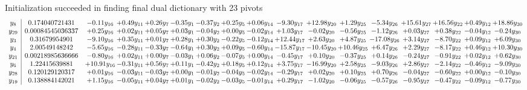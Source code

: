 \documentclass[9pt]{article}
\begin{document}
Initialization succeeded in finding final dual dictionary with 23 pivots
\[\begin{array}{c| c c@{\hskip 2pt} c@{\hskip 2pt} c@{\hskip 2pt} c@{\hskip 2pt} c@{\hskip 2pt} c@{\hskip 2pt} c@{\hskip 2pt} c@{\hskip 2pt} c@{\hskip 2pt} c@{\hskip 2pt} c@{\hskip 2pt} c@{\hskip 2pt} c@{\hskip 2pt} c@{\hskip 2pt} c@{\hskip 2pt} }
 y_{8}   &  0.174040721431 & -0.11 y_{16} & +  0.49 y_{11} & +  0.26 y_{7} & -0.35 y_{1} & -0.37 y_{2} & +  0.25 y_{5} & +  0.06 y_{14} & -9.30 y_{17} & + 12.98 y_{20} & +  1.29 y_{25} & -5.34 y_{26} & + 15.61 y_{27} & + 16.56 y_{22} & +  0.49 y_{12} & + 18.86 y_{30}\\
 y_{29}   &  0.00084545036337 & +  0.25 y_{16} & +  0.02 y_{11} & +  0.05 y_{7} & +  0.03 y_{1} & -0.04 y_{2} & +  0.00 y_{5} & -0.02 y_{14} & +  1.03 y_{17} & -0.02 y_{20} & -0.56 y_{25} & -1.12 y_{26} & +  0.03 y_{27} & +  0.38 y_{22} & -0.04 y_{12} & -0.24 y_{30}\\
 y_{3}   &  0.31679954901 & -9.10 y_{16} & +  0.35 y_{11} & +  0.01 y_{7} & +  0.28 y_{1} & +  0.30 y_{2} & -0.22 y_{5} & -0.12 y_{14} & + 12.44 y_{17} & +  2.63 y_{20} & +  4.87 y_{25} & -17.08 y_{26} & +  3.14 y_{27} & -8.70 y_{22} & +  0.09 y_{12} & +  6.09 y_{30}\\
 y_{4}   &  2.00549148242 & -5.65 y_{16} & -0.28 y_{11} & -0.33 y_{7} & -0.64 y_{1} & +  0.30 y_{2} & +  0.09 y_{5} & -0.60 y_{14} & -15.87 y_{17} & -10.45 y_{20} & + 10.46 y_{25} & +  6.47 y_{26} & +  2.29 y_{27} & -8.17 y_{22} & +  0.46 y_{12} & + 10.30 y_{30}\\
 y_{21}   &  0.00218985636666 & -0.80 y_{16} & +  0.02 y_{11} & +  0.00 y_{7} & -0.03 y_{1} & +  0.06 y_{2} & -0.07 y_{5} & +  0.00 y_{14} & -0.45 y_{17} & +  0.10 y_{20} & -0.37 y_{25} & +  0.14 y_{26} & -0.24 y_{27} & -0.91 y_{22} & +  0.02 y_{12} & +  0.62 y_{30}\\
 y_{6}   &  1.22415639881 & + 10.91 y_{16} & -0.31 y_{11} & +  0.56 y_{7} & +  0.11 y_{1} & -0.42 y_{2} & +  0.18 y_{5} & +  0.12 y_{14} & +  3.75 y_{17} & -16.99 y_{20} & +  2.58 y_{25} & -9.03 y_{26} & +  2.86 y_{27} & -2.14 y_{22} & -0.46 y_{12} & -9.09 y_{30}\\
 y_{28}   &  0.120129120317 & +  0.01 y_{16} & -0.03 y_{11} & -0.03 y_{7} & +  0.00 y_{1} & -0.01 y_{2} & -0.04 y_{5} & -0.02 y_{14} & -0.29 y_{17} & +  0.02 y_{20} & +  0.10 y_{25} & +  0.70 y_{26} & -0.04 y_{27} & -0.60 y_{22} & +  0.00 y_{12} & -0.10 y_{30}\\
 y_{19}   &  0.138884142021 & +  1.15 y_{16} & -0.05 y_{11} & +  0.04 y_{7} & +  0.01 y_{1} & -0.02 y_{2} & -0.03 y_{5} & -0.01 y_{14} & +  0.29 y_{17} & -1.02 y_{20} & -0.06 y_{25} & -0.57 y_{26} & -0.95 y_{27} & -0.47 y_{22} & -0.09 y_{12} & -0.77 y_{30}\\

\end{array}\]
\end{document}
